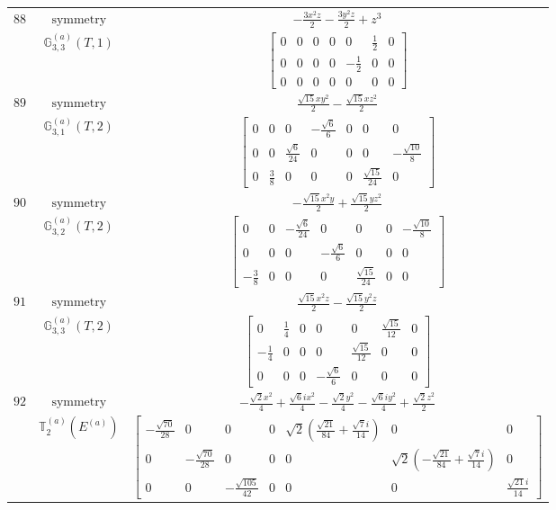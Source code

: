 \documentclass[fleqn,8pt,landscape]{jsarticle}
\begin{document}
\begin{longtable}{ccc}
$ 88 $ & $ \text{symmetry} $ & $ - \frac{3 x^{2} z}{2} - \frac{3 y^{2} z}{2} + z^{3} $ \\
$  $ & $ \mathbb{G}_{3,3}^{(a)}(T,1) $ & $ \begin{bmatrix} 0 & 0 & 0 & 0 & 0 & \frac{1}{2} & 0 \\ 0 & 0 & 0 & 0 & - \frac{1}{2} & 0 & 0 \\ 0 & 0 & 0 & 0 & 0 & 0 & 0 \end{bmatrix} $ \\ \hline
$ 89 $ & $ \text{symmetry} $ & $ \frac{\sqrt{15} x y^{2}}{2} - \frac{\sqrt{15} x z^{2}}{2} $ \\
$  $ & $ \mathbb{G}_{3,1}^{(a)}(T,2) $ & $ \begin{bmatrix} 0 & 0 & 0 & - \frac{\sqrt{6}}{6} & 0 & 0 & 0 \\ 0 & 0 & \frac{\sqrt{6}}{24} & 0 & 0 & 0 & - \frac{\sqrt{10}}{8} \\ 0 & \frac{3}{8} & 0 & 0 & 0 & \frac{\sqrt{15}}{24} & 0 \end{bmatrix} $ \\ \hline
$ 90 $ & $ \text{symmetry} $ & $ - \frac{\sqrt{15} x^{2} y}{2} + \frac{\sqrt{15} y z^{2}}{2} $ \\
$  $ & $ \mathbb{G}_{3,2}^{(a)}(T,2) $ & $ \begin{bmatrix} 0 & 0 & - \frac{\sqrt{6}}{24} & 0 & 0 & 0 & - \frac{\sqrt{10}}{8} \\ 0 & 0 & 0 & - \frac{\sqrt{6}}{6} & 0 & 0 & 0 \\ - \frac{3}{8} & 0 & 0 & 0 & \frac{\sqrt{15}}{24} & 0 & 0 \end{bmatrix} $ \\ \hline
$ 91 $ & $ \text{symmetry} $ & $ \frac{\sqrt{15} x^{2} z}{2} - \frac{\sqrt{15} y^{2} z}{2} $ \\
$  $ & $ \mathbb{G}_{3,3}^{(a)}(T,2) $ & $ \begin{bmatrix} 0 & \frac{1}{4} & 0 & 0 & 0 & \frac{\sqrt{15}}{12} & 0 \\ - \frac{1}{4} & 0 & 0 & 0 & \frac{\sqrt{15}}{12} & 0 & 0 \\ 0 & 0 & 0 & - \frac{\sqrt{6}}{6} & 0 & 0 & 0 \end{bmatrix} $ \\ \hline
$ 92 $ & $ \text{symmetry} $ & $ - \frac{\sqrt{2} x^{2}}{4} + \frac{\sqrt{6} i x^{2}}{4} - \frac{\sqrt{2} y^{2}}{4} - \frac{\sqrt{6} i y^{2}}{4} + \frac{\sqrt{2} z^{2}}{2} $ \\
$  $ & $ \mathbb{T}_{2}^{(a)}(E^{(a)}) $ & $ \begin{bmatrix} - \frac{\sqrt{70}}{28} & 0 & 0 & 0 & \sqrt{2} \left(\frac{\sqrt{21}}{84} + \frac{\sqrt{7} i}{14}\right) & 0 & 0 \\ 0 & - \frac{\sqrt{70}}{28} & 0 & 0 & 0 & \sqrt{2} \left(- \frac{\sqrt{21}}{84} + \frac{\sqrt{7} i}{14}\right) & 0 \\ 0 & 0 & - \frac{\sqrt{105}}{42} & 0 & 0 & 0 & \frac{\sqrt{21} i}{14} \end{bmatrix} $ \\ \hline

\end{longtable}
\end{document}
